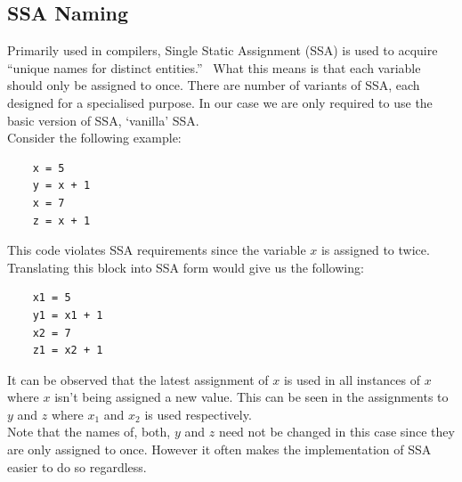 \documentclass[12pt, titlepage]{article}
\begin{document}
\subsection{SSA Naming}
Primarily used in compilers, Single Static Assignment (SSA) is used to acquire ``unique names for distinct entities.''~\cite{ssaBook} What this means is that each variable should only be assigned to once. There are number of variants of SSA, each designed for a specialised purpose. In our case we are only required to use the basic version of SSA, `vanilla' SSA. \\
Consider the following example:
\begin{lstlisting}
	x = 5
	y = x + 1
	x = 7
	z = x + 1
\end{lstlisting}
This code violates SSA requirements since the variable $x$ is assigned to twice. Translating this block into SSA form would give us the following:
\begin{lstlisting}
	x1 = 5
	y1 = x1 + 1
	x2 = 7
	z1 = x2 + 1
\end{lstlisting}
It can be observed that the latest assignment of $x$  is used in all instances of $x$ where $x$ isn't being assigned a new value. This can be seen in the assignments to $y$ and $z$ where $x_1$ and $x_2$ is used respectively. \\
Note that the names of, both, $y$ and $z$ need not be changed in this case since they are only assigned to once. However it often makes the implementation of SSA easier to do so regardless.
\end{document}

